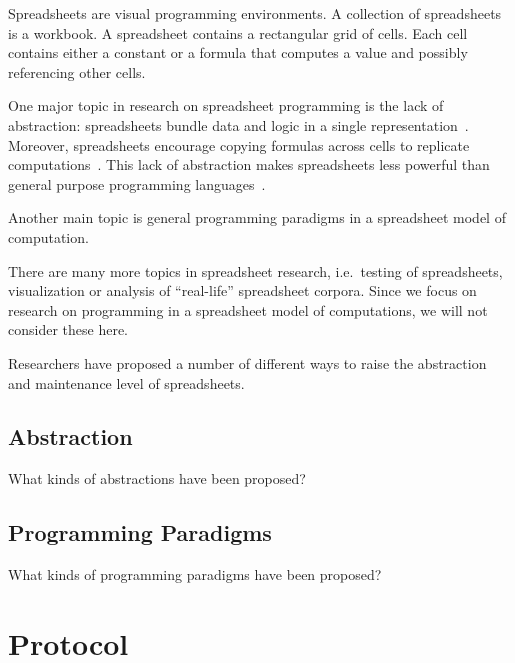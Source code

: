 \documentclass[a4paper]{article}
\begin{document}
Spreadsheets are visual programming environments. A collection of
spreadsheets is a workbook. A spreadsheet contains a rectangular grid
of cells. Each cell contains either a constant or a formula that
computes a value and possibly referencing other cells.

One major topic in research on spreadsheet programming is the lack of
abstraction: spreadsheets bundle data and logic in a single
representation~\cite{Isakowitz:1995:TLT:195705.195708}. Moreover,
spreadsheets encourage copying formulas across cells to replicate
computations~\cite{1173080, Benfield:2009:FFD:1668113.1668121}. This
lack of abstraction makes spreadsheets less powerful than general
purpose programming languages~\cite{Miller:2015:SPB:2814189.2814201}.

Another main topic is general programming paradigms in a spreadsheet
model of computation. 

There are many more topics in spreadsheet research, i.e.\ testing of
spreadsheets, visualization or analysis of ``real-life'' spreadsheet
corpora. Since we focus on research on programming in a spreadsheet
model of computations, we will not consider these here.

Researchers have proposed a number of different ways to raise the
abstraction and maintenance level of spreadsheets.

\subsection{Abstraction}
\label{sec:abstraction}

What kinds of abstractions have been proposed?

\subsection{Programming Paradigms}
\label{sec:progr-parad}

What kinds of programming paradigms have been proposed?




\appendix

\newpage{}

\section{Protocol}
\label{sec:protocol}
\end{document}
